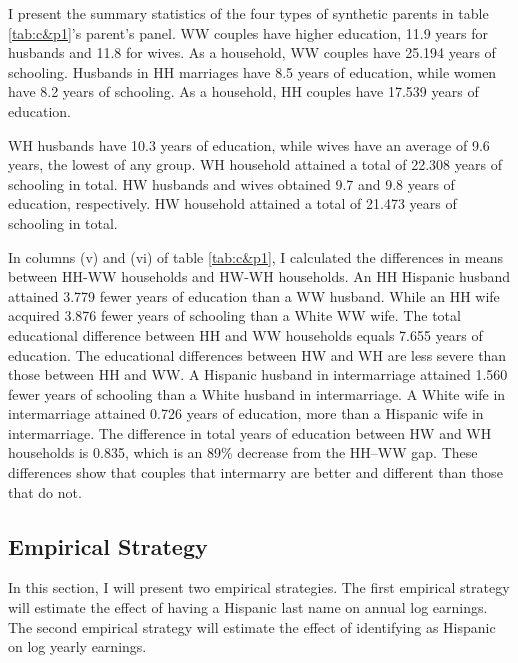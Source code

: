 \documentclass[12pt, fullpage]{article}
\begin{document}
I present the summary statistics of the four types of synthetic parents in table \ref{tab:c&p1}'s parent's panel. WW couples have higher education, 11.9 years for husbands and 11.8 for wives. As a household, WW couples have 25.194 years of schooling. Husbands in HH marriages have 8.5 years of education, while women have 8.2 years of schooling. As a household, HH couples have 17.539 years of education.

WH husbands have 10.3 years of education, while wives have an average of 9.6 years, the lowest of any group. WH household attained a total of 22.308 years of schooling in total. HW husbands and wives obtained 9.7 and 9.8 years of education, respectively. HW household attained a total of 21.473 years of schooling in total.

In columns (v) and (vi) of table \ref{tab:c&p1}, I calculated the differences in means between HH-WW households and HW-WH households. An HH Hispanic husband attained 3.779 fewer years of education than a WW husband. While an HH wife acquired 3.876 fewer years of schooling than a White WW wife. The total educational difference between HH and WW households equals 7.655 years of education. The educational differences between HW and WH are less severe than those between HH and WW. A Hispanic husband in intermarriage attained 1.560 fewer years of schooling than a White husband in intermarriage. A White wife in intermarriage attained 0.726 years of education, more than a Hispanic wife in intermarriage. The difference in total years of education between HW and WH households is 0.835, which is an 89\% decrease from the HH--WW gap. These differences show that couples that intermarry are better and different than those that do not.


\subsection{Empirical Strategy}\label{sec:emp_model}
In this section, I will present two empirical strategies. The first empirical strategy will estimate the effect of having a Hispanic last name on annual log earnings. The second empirical strategy will estimate the effect of identifying as Hispanic on log yearly earnings.
\end{document}
